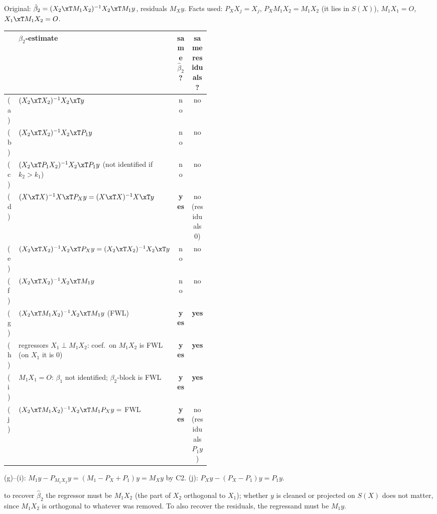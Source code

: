 \begin{solbox}
Original: $\hat\beta_{2}=(X_{2}\xT M_{1}X_{2})^{-1}X_{2}\xT M_{1}y$, residuals $M_{X}y$. Facts used:
$P_{X}X_{j}=X_{j}$, $P_{X}M_{1}X_{2}=M_{1}X_{2}$ (it lies in $S(X)$), $M_{1}X_{1}=O$, $X_{1}\xT M_{1}X_{2}=O$.
\begin{center}
\renewcommand{\arraystretch}{1.15}\small
\begin{tabular}{l p{0.47\linewidth} c c}
\toprule
 & $\beta_{2}$-estimate & same $\hat\beta_{2}$? & same residuals? \\
\midrule
(a) & $(X_{2}\xT X_{2})^{-1}X_{2}\xT y$ & no & no \\
(b) & $(X_{2}\xT X_{2})^{-1}X_{2}\xT P_{1}y$ & no & no \\
(c) & $(X_{2}\xT P_{1}X_{2})^{-1}X_{2}\xT P_{1}y$ (not identified if $k_{2}>k_{1}$) & no & no \\
(d) & $(X\xT X)^{-1}X\xT P_{X}y=(X\xT X)^{-1}X\xT y$ & \textbf{yes} & no (residuals $0$) \\
(e) & $(X_{2}\xT X_{2})^{-1}X_{2}\xT P_{X}y=(X_{2}\xT X_{2})^{-1}X_{2}\xT y$ & no & no \\
(f) & $(X_{2}\xT X_{2})^{-1}X_{2}\xT M_{1}y$ & no & no \\
(g) & $(X_{2}\xT M_{1}X_{2})^{-1}X_{2}\xT M_{1}y$ (FWL) & \textbf{yes} & \textbf{yes} \\
(h) & regressors $X_{1}\perp M_{1}X_{2}$: coef.\ on $M_{1}X_{2}$ is FWL (on $X_{1}$ it is $0$) & \textbf{yes} & \textbf{yes} \\
(i) & $M_{1}X_{1}=O$: $\beta_{1}$ not identified; $\beta_{2}$-block is FWL & \textbf{yes} & \textbf{yes} \\
(j) & $(X_{2}\xT M_{1}X_{2})^{-1}X_{2}\xT M_{1}P_{X}y=$ FWL & \textbf{yes} & no (residuals $P_{1}y$) \\
\bottomrule
\end{tabular}
\end{center}
 (g)--(i): $M_{1}y-P_{M_{1}X_{2}}y=(M_{1}-P_{X}+P_{1})y=M_{X}y$ by C2. (j): $P_{X}y-(P_{X}-P_{1})y=P_{1}y$.
\begin{why}\Why to recover $\hat\beta_{2}$ the regressor must be $M_{1}X_{2}$ (the part of $X_{2}$ orthogonal to $X_{1}$);
whether $y$ is cleaned or projected on $S(X)$ does not matter, since $M_{1}X_{2}$ is orthogonal to whatever was removed.
To also recover the residuals, the regressand must be $M_{1}y$.\end{why}
\end{solbox}

